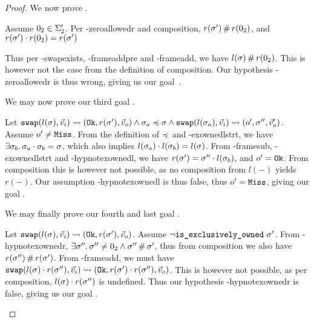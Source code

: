 \begin{proof}

We now prove .

\begin{hypvlist}
	 Assume $0_2\in \Sigma_2'$.
	 Per \hyp{zeroallowedr} and composition, $r(\sigma')\operatorname{\#} r(0_2)$, and $r(\sigma')\cdot r(0_2)= r(\sigma')$
\end{hypvlist}

Thus per \hyp{swapexists}, \hyp{frameaddpre} and \hyp{frameadd}, we have $l(\sigma)\operatorname{\#} r(0_2)$. This is however not the case from the definition of composition. Our hypothesis \hyp{zeroallowedr} is thus wrong, giving us our goal~.


We may now prove our third goal .

\begin{hypvlist}
	 Let $\texttt{swap}(l(\sigma),\vec{v}_i)\rightsquigarrow(\texttt{Ok},r(\sigma'),\vec{v}_o) \land \sigma_a\preccurlyeq\sigma \land \texttt{swap}(l(\sigma_a),\vec{v}_i)\rightsquigarrow(o',\sigma'',\vec{v}_o')$.%
	 Assume $o'\neq\texttt{Miss}$.
	 From the definition of $\preccurlyeq$ and \hyp{exownedlstrt}, we have $\exists \sigma_b\ldotp \sigma_a\cdot\sigma_b=\sigma$, which also implies $l(\sigma_a)\cdot l(\sigma_b) = l(\sigma)$.
	 From \hyp{framesub}, \hyp{exownedlstrt} and \hyp{hypnotexownedl}, we have $r(\sigma')=\sigma''\cdot l(\sigma_b)$, and $o'=\texttt{Ok}$. From composition this is however not possible, as no composition from $l(-)$ yields $r(-)$. Our assumption \hyp{hypnotexownedl} is thus false, thus $o'=\texttt{Miss}$, giving our goal .
\end{hypvlist}



We may finally prove our fourth and last goal .

\begin{hypvlist}
	 Let $\texttt{swap}(l(\sigma),\vec{v}_i)\rightsquigarrow(\texttt{Ok},r(\sigma'),\vec{v}_o)$.
	 Assume $\neg\texttt{is\_exclusively\_owned}~\sigma'$.
	 From \hyp{hypnotexownedr}, $\exists \sigma''\ldotp \sigma''\neq0_2 \land \sigma''\operatorname{\#}\sigma'$, thus from composition we also have $r(\sigma'')\operatorname{\#} r(\sigma')$.%
	 From \hyp{frameadd}, we must have $\texttt{swap}(l(\sigma)\cdot r(\sigma''),\vec{v}_i)\rightsquigarrow(\texttt{Ok},r(\sigma')\cdot r(\sigma''),\vec{v}_o)$. This is however not possible, as per composition, $l(\sigma)\cdot r(\sigma'')$ is undefined. Thus our hypothesis \hyp{hypnotexownedr} is false, giving us our goal .

\end{hypvlist}

\end{proof}
